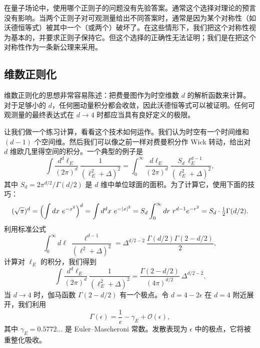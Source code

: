 在量子场论中，使用哪个正则子的问题没有先验答案。通常这个选择对理论的预言没有影响。当两个正则子对可观测量给出不同答案时，通常是因为某个对称性（如沃德恒等式）被其中一个（或两个）破坏了。在这些情形下，我们把这个对称性视为基本的，并要求正则子保持它。但这个选择的正确性无法证明；我们是在把这个对称性作为一条新公理来采用。

\subsection{维数正则化}

维数正则化的思想非常容易陈述：把费曼图作为时空维数 $d$ 的解析函数来计算。对于足够小的 $d$，任何圈动量积分都会收敛，因此沃德恒等式可以被证明。任何可观测量的最终表达式在 $d\to 4$ 时都应当具有良好定义的极限。

让我们做一个练习计算，看看这个技术如何运作。我们认为时空有一个时间维和 $(d-1)$ 个空间维。然后我们可以像之前一样对费曼积分作 Wick 转动，给出对 $d$ 维欧几里得空间的积分。一个典型的例子是
\begin{equation}
  \int \frac{d^d\ell_E}{(2\pi)^d}\ \frac{1}{(\ell_E^2 + \Delta)^2}
  = \int_0^{\infty} \frac{d\ell_E}{(2\pi)^d}\ \frac{S_d\,\ell_E^{d-1}}
    {(\ell_E^2 + \Delta)^2} ,
  \label{eq:7.80}
\end{equation}
其中 $S_d = 2\pi^{d/2}/\Gamma(d/2)$ 是 $d$ 维中单位球面的面积。为了计算它，使用下面的技巧：
\begin{equation}
  (\sqrt{\pi})^d = \Bigl( \int dx\ e^{-x^2} \Bigr)^d
    = \int d^d x\ e^{-|x|^2}
    = S_d \int_0^{\infty} dr\ r^{d-1} e^{-r^2}
    = S_d\cdot \tfrac{1}{2}\Gamma(d/2) .
\end{equation}
利用标准公式
\begin{equation}
  \int_0^{\infty} d\ell\ \frac{\ell^{d-1}}{(\ell^2+\Delta)^2}
    = \Delta^{d/2-2}\ \frac{\Gamma(d/2)\Gamma(2-d/2)}{2},
\end{equation}
计算对 $\ell_E$ 的积分，我们得到
\begin{equation}
  \int \frac{d^d\ell_E}{(2\pi)^d}\ \frac{1}{(\ell_E^2+\Delta)^2}
  = \frac{\Gamma(2-d/2)}{(4\pi)^{d/2}}\ \Delta^{d/2-2} .
  \label{eq:7.81}
\end{equation}
当 $d\to 4$ 时，伽马函数 $\Gamma(2-d/2)$ 有一个极点。令 $d = 4-2\epsilon$ 在 $d=4$ 附近展开，我们利用
\begin{equation}
  \Gamma(\epsilon) = \frac{1}{\epsilon} - \gamma_E + \mathcal{O}(\epsilon),
\end{equation}
其中 $\gamma_E = 0.5772\ldots$ 是 Euler--Mascheroni 常数。发散表现为 $\epsilon$ 中的极点，它将被重整化吸收。

